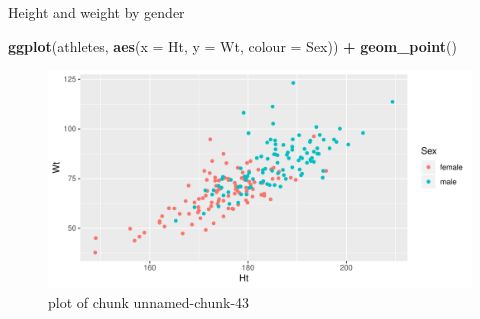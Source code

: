 \documentclass[ignorenonframetext,]{beamer}
\newenvironment{Shaded}{\begin{snugshade}}{\end{snugshade}}
\newcommand{\DataTypeTok}[1]{\textcolor[rgb]{0.13,0.29,0.53}{#1}}
\newcommand{\KeywordTok}[1]{\textcolor[rgb]{0.13,0.29,0.53}{\textbf{#1}}}
\newcommand{\NormalTok}[1]{#1}
\newcommand{\OperatorTok}[1]{\textcolor[rgb]{0.81,0.36,0.00}{\textbf{#1}}}
\newcommand{\StringTok}[1]{\textcolor[rgb]{0.31,0.60,0.02}{#1}}
\begin{document}
\begin{frame}[fragile]{Height and weight by gender}
\protect\hypertarget{height-and-weight-by-gender}{}

\begin{Shaded}
\begin{Highlighting}[]
\KeywordTok{ggplot}\NormalTok{(athletes, }\KeywordTok{aes}\NormalTok{(}\DataTypeTok{x =}\NormalTok{ Ht, }\DataTypeTok{y =}\NormalTok{ Wt, }\DataTypeTok{colour =}\NormalTok{ Sex)) }\OperatorTok{+}
\StringTok{  }\KeywordTok{geom_point}\NormalTok{()}
\end{Highlighting}
\end{Shaded}

\begin{figure}
\centering
\includegraphics{figure/unnamed-chunk-43-1.pdf}
\caption{plot of chunk unnamed-chunk-43}
\end{figure}

\end{frame}
\end{document}
